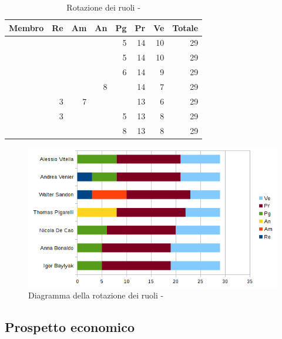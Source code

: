 \documentclass[12pt,a4paper]{article}
\begin{document}
\begin{table}[H]
	\begin{center}
		\begin{tabular}{l r r r r r r r}
			\toprule
			\textbf{Membro}	&	\textbf{Re}	&	\textbf{Am}	& \textbf{An} & \textbf{Pg} & \textbf{Pr} & \textbf{Ve} & \textbf{Totale}\\
			\midrule
			\midrule
			\IB & & & & 5 & 14 & 10 & 29 \\
			\midrule
			\AB & & & & 5 & 14 & 10 & 29 \\
			\midrule
			\NDC & & & & 6 & 14 & 9 & 29 \\
			\midrule
			\TP & & & 8 & & 14 & 7 & 29 \\
			\midrule
			\WS & 3 & 7 & & & 13 & 6 & 29 \\
			\midrule
			\AVE & 3 & & & 5 & 13 & 8 & 29 \\
			\midrule
			\AVI & & & & 8 & 13 & 8 & 29 \\
			\bottomrule
		\end{tabular}
		\caption{Rotazione dei ruoli - \FPDC}
	\end{center}
\end{table}

\begin{center}
	\begin{figure}[H]
		\centering		\includegraphics[width=\textwidth]{diagrammaBarreProgettazioneDettaglioCodificaRotazioneRuoli.png}
		\caption{Diagramma della rotazione dei ruoli - \FPDC}
	\end{figure}
\end{center}

\subsection{Prospetto economico}
\end{document}
